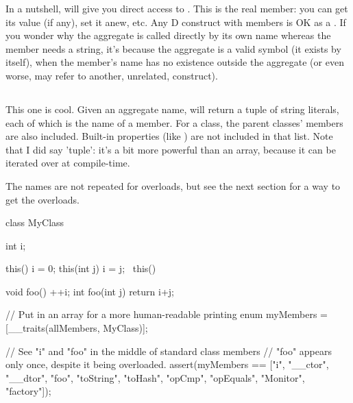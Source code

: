 In a nutshell,  will give you direct access to . This is the real member: you can get its value (if any), set it anew, etc. Any D construct with members is OK as a . If you wonder why the aggregate is called directly by its own name whereas the member needs a string, it's because the aggregate is a valid symbol (it exists by itself), when the member's name has no existence outside the aggregate (or even worse, may refer to another, unrelated, construct).


\subsection{}

This one is cool. Given an aggregate name,  will return a tuple of string literals, each of which is the name of a member. For a class, the parent classes' members are also included. Built-in properties (like ) are not included in that list. Note that I did say 'tuple': it's a bit more powerful than an array, because it can be iterated over at compile-time.

The names are not repeated for overloads, but see the next section for a way to get the overloads.

\begin{dcode}
class MyClass 
{
    int i;
    
    this() { i = 0;}
    this(int j) { i = j;}
    ~this() { }
    
    void foo() { ++i;}
    int foo(int j) { return i+j;}
}

// Put in an array for a more human-readable printing
enum myMembers = [__traits(allMembers, MyClass)];

// See "i" and "foo" in the middle of standard class members
// "foo" appears only once, despite it being overloaded.
assert(myMembers == ["i", "__ctor", "__dtor", "foo", "toString", 
                     "toHash", "opCmp", "opEquals", "Monitor", "factory"]);
\end{dcode}

